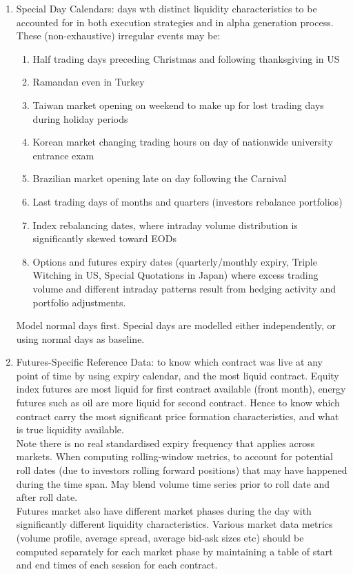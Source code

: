 \begin{definition}
\begin{enumerate}[label=\roman*.]
\item Special Day Calendars: days wth distinct liquidity characteristics to be accounted for in both execution strategies and in alpha generation process. These (non-exhaustive) irregular events may be:
\begin{enumerate}[label=\arabic*.]
\setlength{\itemsep}{0pt}
\item Half trading days preceding Christmas and following thanksgiving in US
\item Ramandan even in Turkey
\item Taiwan market opening on weekend to make up for lost trading days during holiday periods
\item Korean market changing trading hours on day of nationwide university entrance exam
\item Brazilian market opening late on day following the Carnival
\item Last trading days of months and quarters (investors rebalance portfolios)
\item Index rebalancing dates, where intraday volume distribution is significantly skewed toward EODs
\item Options and futures expiry dates (quarterly/monthly expiry, Triple Witching in US, Special Quotations in Japan) where excess trading volume and different intraday patterns result from hedging activity and portfolio adjustments.
\end{enumerate}
Model normal days first. Special days are modelled either independently, or using normal days as baseline.
\item Futures-Specific Reference Data: to know which contract was live at any point of time by using expiry calendar, and the most liquid contract. Equity index futures are most liquid for first contract available (front month), energy futures such as oil are more liquid for second contract. Hence to know which contract carry the most significant price formation characteristics, and what is true liquidity available.\\
Note there is no real standardised expiry frequency that applies across markets. When computing rolling-window metrics, to account for potential roll dates (due to investors rolling forward positions) that may have happened during the time span. May blend volume time series prior to roll date and after roll date.\\
Futures market also have different market phases during the day with significantly different liquidity characteristics. Various market data metrics (volume profile, average spread, average bid-ask sizes etc) should be computed separately for each market phase by maintaining a table of start and end times of each session for each contract.

\end{enumerate}
\end{definition}
